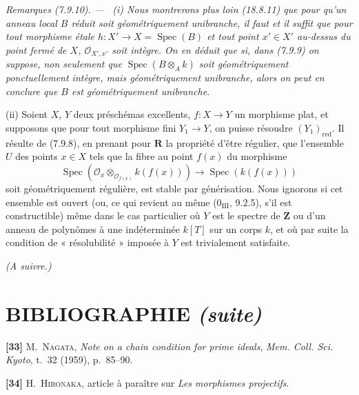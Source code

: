 \documentclass[10pt,oneside]{book}
\newcommand{\oldpage}[2][]{%
  \setcounter{footnote}{0}%
  \marginpar{\scriptsize\textbf{#1}~|~#2}\ignorespaces}
\newenvironment{remarks}[1][]{%
  \par\medskip\noindent\itshape Remarques (#1). ---\ }{\par}
\begin{document}
\begin{remarks}[7.9.10]
\label{IV.2.s7.9.10-fr}
(i) Nous montrerons plus loin (18.8.11) que pour qu'un anneau local $B$ réduit
soit géométriquement unibranche, il faut et il suffit que pour tout morphisme
étale $h:X'\to X=\operatorname{Spec}(B)$ et tout point $x'\in X'$ au-dessus
du point fermé de $X$, $\mathcal O_{X',x'}$ soit intègre. On en déduit que si,
dans (7.9.9) on suppose, non seulement que
$\operatorname{Spec}(B\otimes_Ak)$ soit géométriquement ponctuellement
intègre, mais géométriquement unibranche, alors on peut en conclure que $B$ est
géométriquement unibranche.

\oldpage[IV-2]{223}

(ii) Soient $X$, $Y$ deux préschémas excellents, $f:X\to Y$ un morphisme
plat, et supposons que pour tout morphisme fini $Y_1\to Y$, on puisse résoudre
$(Y_1)_{\mathrm{red}}$. Il résulte de (7.9.8), en prenant pour
$\boldsymbol R$ la propriété d'être régulier, que l'ensemble $U$ des points
$x\in X$ tels que la fibre au point $f(x)$ du morphisme
\[
\operatorname{Spec}(\mathcal O_x\otimes_{\mathcal O_{f(x)}}k(f(x)))
\longrightarrow\operatorname{Spec}(k(f(x)))
\]
soit géométriquement régulière, est stable par générisation. Nous ignorons si
cet ensemble est ouvert (ou, ce qui revient au même (0$_{\mathrm{III}}$,
9.2.5), s'il est constructible) même dans le cas particulier où $Y$ est le
spectre de $\mathbf Z$ ou d'un anneau de polynômes à une indéterminée $k[T]$
sur un corps $k$, et où par suite la condition de « résolubilité » imposée à
$Y$ est trivialement satisfaite.
\end{remarks}

\begin{center}
\emph{(A suivre.)}
\end{center}

\clearpage
\oldpage[IV-2]{224}
{}
\section*{BIBLIOGRAPHIE \textnormal{\emph{(suite)}}}

\begingroup
\small
\setlength{\parindent}{0pt}
\setlength{\parskip}{4pt}

\textbf{[33]} M.~\textsc{Nagata}, \emph{Note on a chain condition for prime
ideals}, \emph{Mem. Coll. Sci. Kyoto}, t.~32 (1959), p.~85--90.

\textbf{[34]} H.~\textsc{Hironaka}, article à paraître sur \emph{Les morphismes
projectifs}.
\end{document}

